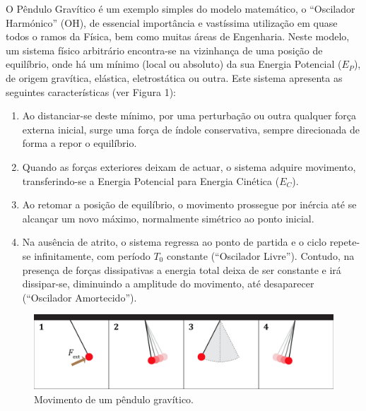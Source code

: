 \documentclass[a4paper,twoside,12pt]{article}      %
\begin{document}
O Pêndulo Gravítico é um exemplo simples do modelo  matemático, o ``Oscilador Harmónico'' (OH), 
de essencial importância e  vastíssima utilização em quase todos o ramos da Física,
 bem como muitas áreas de Engenharia. 
 Neste modelo, um sistema físico arbitrário encontra-se na vizinhança de uma posição 
 de equilíbrio, onde há um mínimo (local ou absoluto) da sua Energia Potencial  ($E_P$), de origem gravítica, elástica, eletrostática ou outra. Este sistema apresenta as seguintes características (ver Figura 1):
\begin{enumerate}
\item  Ao distanciar-se deste mínimo, por uma perturbação ou outra qualquer força externa inicial, 
surge uma força de índole conservativa, sempre direcionada de forma a repor o equilíbrio.
\item Quando as forças exteriores deixam de actuar, o sistema adquire movimento, 
transferindo-se a Energia Potencial para Energia Cinética ($E_C$).
\item Ao retomar a posição de equilíbrio, o movimento prossegue por inércia até se alcançar um 
novo máximo, normalmente simétrico ao ponto inicial.
\item Na ausência de atrito, o sistema regressa  ao ponto de partida e o ciclo repete-se infinitamente, com período $T_0$ constante (``Oscilador Livre''). Contudo, na presença de forças dissipativas a energia total deixa de ser constante e irá dissipar-se, diminuindo a amplitude do movimento, até desaparecer (``Oscilador Amortecido'').
\end{enumerate}
\begin{figure}
	[b] \centering 
	\includegraphics[width=0.9	\textwidth]{Fig-1} 
	\caption{Movimento de um pêndulo gravítico.  \label{fig:1}} 
\end{figure}



\end{document}

